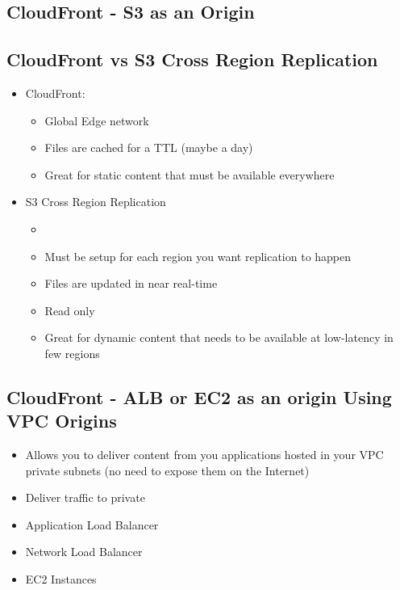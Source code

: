 \subsection{CloudFront - S3 as an Origin}

\subsection{CloudFront vs S3 Cross Region Replication}
\begin{itemize}
    \item CloudFront:
    \begin{itemize}
        \item Global Edge network
        \item Files are cached for a TTL (maybe a day)
        \item Great for static content that must be available everywhere
    \end{itemize}
    \item S3 Cross Region Replication
    \begin{itemize}
        \item \item Must be setup for each region you want replication to happen
        \item Files are updated in near real-time
        \item Read only
        \item Great for dynamic content that needs to be available at low-latency in few regions
    \end{itemize}
\end{itemize}

\subsection{CloudFront - ALB or EC2 as an origin Using VPC Origins}
\begin{itemize}
    \item Allows you to deliver content from you applications hosted in your VPC private subnets (no need to expose them on the Internet)
    \item Deliver traffic to private
    \item Application Load Balancer
    \item Network Load Balancer
    \item EC2 Instances
\end{itemize}


